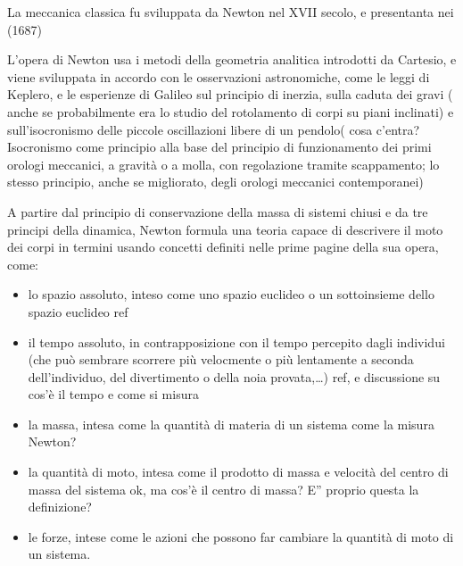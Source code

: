 \documentclass[letterpaper,10pt,italian]{jupyterBook}
\begin{document}
\sphinxAtStartPar
La meccanica classica fu sviluppata da Newton nel XVII secolo, e presentanta nei  (1687)  

\sphinxAtStartPar
L’opera di Newton  usa i metodi della geometria analitica introdotti da Cartesio, e viene sviluppata in accordo con le osservazioni astronomiche, come le leggi di Keplero, e le esperienze di Galileo sul principio di inerzia, sulla caduta dei gravi ( anche se probabilmente era lo studio del rotolamento di corpi su piani inclinati) e sull’isocronismo delle piccole oscillazioni libere di un pendolo( cosa c’entra? Isocronismo come principio alla base del principio di funzionamento dei primi orologi meccanici, a gravità o a molla, con regolazione tramite scappamento; lo stesso principio, anche se migliorato, degli orologi meccanici contemporanei)

\sphinxAtStartPar
A partire dal principio di conservazione della massa di sistemi chiusi e da tre principi della dinamica, Newton formula una teoria capace di descrivere il moto dei corpi in termini usando concetti definiti nelle prime pagine della sua opera, come:
\begin{itemize}
\item {} 
\sphinxAtStartPar
lo spazio assoluto, inteso come uno spazio euclideo o un sottoinsieme dello spazio euclideo  ref

\item {} 
\sphinxAtStartPar
il tempo assoluto, in contrapposizione con il tempo percepito dagli individui (che può sembrare scorrere più velocmente o più lentamente a seconda dell’individuo, del divertimento o della noia provata,…)  ref, e discussione su cos’è il tempo e come si misura

\item {} 
\sphinxAtStartPar
la massa, intesa come la quantità di materia di un sistema  come la misura Newton?

\item {} 
\sphinxAtStartPar
la quantità di moto, intesa come il prodotto di massa e velocità del centro di massa del sistema  ok, ma cos’è il centro di massa? E” proprio questa la definizione?

\item {} 
\sphinxAtStartPar
le forze, intese come le azioni che possono far cambiare la quantità di moto di un sistema.

\end{itemize}
\end{document}
